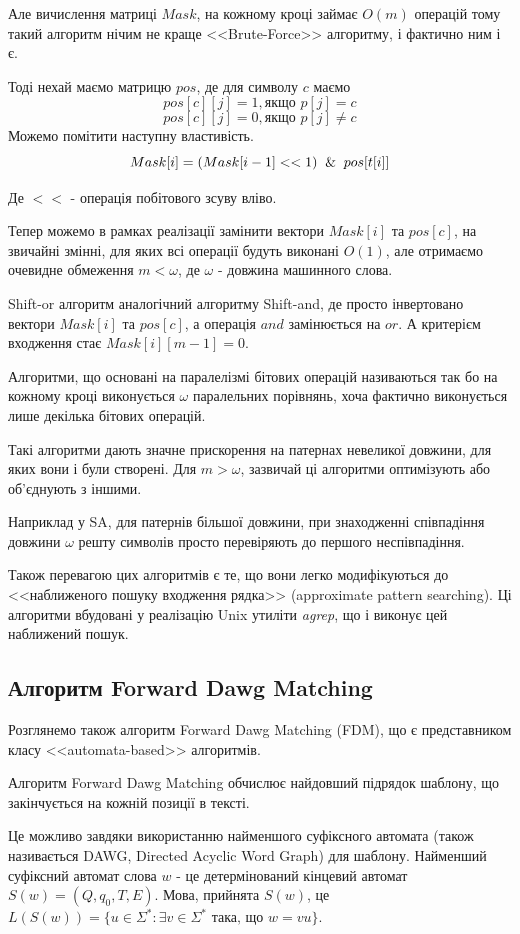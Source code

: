 \documentclass[a4paper,14pt]{extarticle} %
\begin{document}
	Але вичислення матриці $Mask$, на кожному кроці займає $O(m)$ операцій тому такий алгоритм нічим не краще <<Brute-Force>> алгоритму, і фактично ним і є.

	Тоді нехай маємо матрицю $pos$, де для символу $c$ маємо
	\[pos[c][j] = 1,\text{якщо } p[j]=c\]
	\[pos[c][j] = 0,\text{якщо } p[j] \neq c\]
	Можемо помітити наступну властивість. 
	$$Mask[i]=(Mask[i-1]<<1)\And pos[t[i]]$$

	Де $<<$ - операція побітового зсуву вліво.

	Тепер можемо в рамках реалізації замінити вектори $Mask[i]$ та $pos[c]$, на звичайні змінні, для яких всі операції будуть виконані $O(1)$, але отримаємо очевидне обмеження $m<\omega$, де $\omega$ - довжина машинного слова.

	Shift-or алгоритм аналогічний алгоритму Shift-and, де просто інвертовано вектори $Mask[i]$ та $pos[c]$, а операція $and$ замінюється на $or$. 
	А критерієм входження стає $Mask[i][m-1]=0$.

	Алгоритми, що основані на паралелізмі бітових операцій називаються так бо на кожному кроці виконується $\omega$ паралельних порівнянь, хоча фактично виконується лише декілька бітових операцій.

	Такі алгоритми дають значне прискорення на патернах невеликої довжини, для яких вони і були створені. Для $m>\omega$, зазвичай ці алгоритми оптимізують або об'єднують з іншими.

	Наприклад у SA, для патернів більшої довжини, при знаходженні співпадіння довжини $\omega$ решту символів просто перевіряють до першого неспівпадіння.

	Також перевагою цих алгоритмів є те, що вони легко модифікуються до <<наближеного пошуку входження рядка>> (approximate pattern searching).
	Ці алгоритми вбудовані у реалізацію Unix утиліти \textit{agrep}, що і виконує цей наближений пошук.
    
	\subsection{Алгоритм Forward Dawg Matching}
Розглянемо також алгоритм Forward Dawg Matching (FDM), що є представником класу <<automata-based>> алгоритмів.

Алгоритм Forward Dawg Matching обчислює найдовший підрядок шаблону, що закінчується на кожній позиції в тексті.

Це можливо завдяки використанню найменшого суфіксного автомата (також називається DAWG, Directed Acyclic Word Graph) для шаблону. Найменший суфіксний автомат слова \( w \) - це детермінований кінцевий автомат \( S(w) = (Q, q_0, T, E) \). Мова, прийнята \( S(w) \), це \( L(S(w)) = \{u \in \Sigma^* : \exists v \in \Sigma^* \text{ така, що } w = vu\} \).
\end{document}
